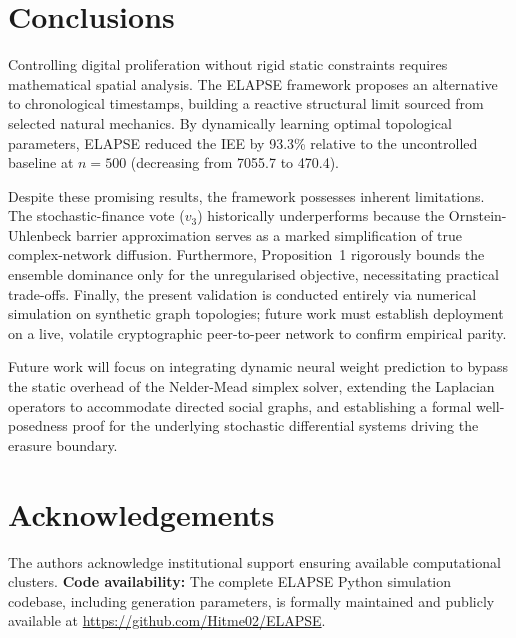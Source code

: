 \documentclass[conference]{IEEEtran}
\begin{document}
\section{Conclusions}

Controlling digital proliferation without rigid static constraints requires mathematical
spatial analysis. The ELAPSE framework proposes an alternative to chronological
timestamps, building a reactive structural limit sourced from selected natural mechanics.
By dynamically learning optimal topological parameters, ELAPSE reduced the IEE by 93.3\%
relative to the uncontrolled baseline at $n = 500$ (decreasing from 7055.7 to 470.4).

Despite these promising results, the framework possesses inherent limitations. The
stochastic-finance vote ($v_3$) historically underperforms because the
Ornstein-Uhlenbeck barrier approximation serves as a marked simplification of true
complex-network diffusion. Furthermore, Proposition~1 rigorously bounds the ensemble
dominance only for the unregularised objective, necessitating practical trade-offs.
Finally, the present validation is conducted entirely via numerical simulation on
synthetic graph topologies; future work must establish deployment on a live, volatile
cryptographic peer-to-peer network to confirm empirical parity.

Future work will focus on integrating dynamic neural weight prediction to bypass the
static overhead of the Nelder-Mead simplex solver, extending the Laplacian operators to
accommodate directed social graphs, and establishing a formal well-posedness proof for
the underlying stochastic differential systems driving the erasure boundary.

\section*{Acknowledgements}

The authors acknowledge institutional support ensuring available computational clusters.
\textbf{Code availability:} The complete ELAPSE Python simulation codebase, including
generation parameters, is formally maintained and publicly available at
\url{https://github.com/Hitme02/ELAPSE}.
\end{document}
